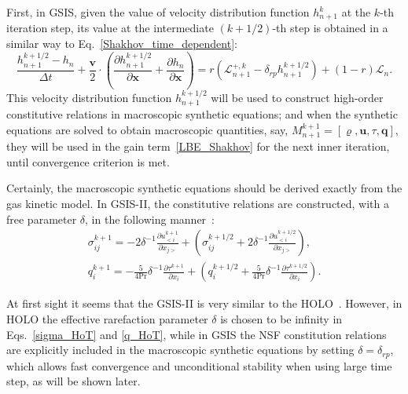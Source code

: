 \documentclass[onefignum,onetabnum]{siamart171218}
\begin{document}
First, in GSIS, given the value of velocity distribution function $h_{n+1}^{k}$ at the $k$-th iteration step, its value at the intermediate $(k+1/2)$-th step is obtained in a similar way to Eq.~\eqref{Shakhov_time_dependent}:
\begin{equation}\label{Shakhov_time_dependent_intermediate}
\frac{h^{k+1/2}_{n+1}-h_n}{\Delta{t}}+
\frac{\bm{v} }{2}\cdot
\left( \frac{\partial{h^{k+1/2}_{n+1}}}{\partial\bm{x}}
+ \frac{\partial{h_{n}}}{\partial\bm{x}}\right) =r\left({\mathcal{L}_{n+1}^{+,k}- \delta_{rp}  h_{n+1}^{k+1/2}}\right)
+(1-r){ \mathcal{L}_{n} }. 
\end{equation}
This velocity distribution function $h^{k+1/2}_{n+1}$ will be used to construct high-order constitutive relations in macroscopic synthetic equations; and when the synthetic equations are solved to obtain macroscopic quantities, say, $M^{k+1}_{n+1}=[\varrho,\bm{u}, \tau,\bm{q}]$,  they will be used in the gain term~\eqref{LBE_Shakhov} for the next inner iteration, until convergence criterion is met. %


Certainly, the macroscopic synthetic equations should be derived exactly from the gas kinetic model. In GSIS-II, the constitutive relations are constructed, with a free parameter $\delta$, in the following manner~\cite{Zhu2021JCP}:
\begin{eqnarray}
\sigma^{k+1}_{ij} =-2\delta^{-1}\frac{\partial u^{k+1}_{<i}}{\partial {x_{j>}}}
+\left(\sigma^{k+1/2}_{ij} +2\delta^{-1}\frac{\partial u^{k+1/2}_{<i}}{\partial {x_{j>}}}\right), \label{sigma_HoT}\\
q^{k+1}_i =-\frac{5}{4\mathrm{Pr}}\delta^{-1} \frac{\partial \tau^{k+1}}{\partial x_i}+
\left(q_i^{k+1/2} +\frac{5}{4\mathrm{Pr}}\delta^{-1} \frac{\partial \tau^{k+1/2}}{\partial x_i}\right). \label{q_HoT}
\end{eqnarray}




At first sight it seems that the GSIS-II is very similar to the HOLO~\cite{Taitano2014}. However, in HOLO the effective rarefaction parameter $\delta$ is chosen to be infinity in Eqs.~\eqref{sigma_HoT} and \eqref{q_HoT}, while in GSIS the NSF constitution relations are explicitly included in the macroscopic synthetic equations by setting $\delta=\delta_{rp}$, which allows fast convergence and unconditional stability when using large time step, as will be shown later. 
	

\end{document}

